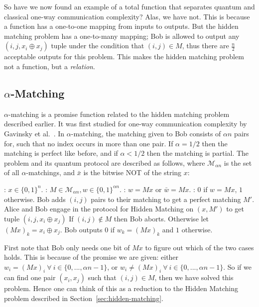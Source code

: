 \documentclass[a4paper]{article}
\begin{document}
        So have we now found an example of a total function that separates quantum and classical one-way communication complexity? Alas, we have not. This is because a function has a one-to-one mapping from inputs to outputs. But the hidden matching problem has a one-to-many mapping; Bob is allowed to output any $(i, j, x_i \oplus x_j)$ tuple under the condition that $(i, j) \in M$, thus there are $\frac{n}{2}$ acceptable outputs for this problem. This makes the hidden matching problem not a function, but a {\em relation}.

        \subsection{$\alpha$-Matching}

        $\alpha$-matching is a promise function related to the hidden matching problem described earlier. It was first studied for one-way communication complexity by Gavinsky et al.~\cite{Gavinsky:2007:ESO:1250790.1250866}. In $\alpha$-matching, the matching given to Bob consists of $\alpha n$ pairs for, such that no index occurs in more than one pair. If $\alpha = 1/2$ then the matching is perfect like before, and if $\alpha < 1/2$ then the matching is partial. The problem and its quantum protocol are described as follows, where $\mathcal{M}_{\alpha n}$ is the set of all $\alpha$-matchings, and $\bar{x}$ is the bitwise NOT of the string $x$:

        \begin{codebox}
            \zi {}: $x \in \{0,1\}^n$.
            \zi {}: $M \in \mathcal{M}_{\alpha n}, w \in \{0, 1\}^{\alpha n}$.
            \zi {}: $w = Mx$ or $\bar{w} = Mx$.
            \zi {}: $0$ if $w = Mx$, $1$ otherwise.
            \li Bob adds $(i, j)$ pairs to their matching to get a perfect matching $M'$.
            \li Alice and Bob engage in the protocol for Hidden Matching on $(x, M')$ to get tuple $(i, j, x_i \oplus x_j)$
            \li If $(i, j) \notin M$ then Bob aborts. Otherwise let $(Mx)_k = x_i \oplus x_j$.
            \li Bob outputs $0$ if $w_k = (Mx)_k$ and $1$ otherwise.
        \end{codebox}

        First note that Bob only needs one bit of $Mx$ to figure out which of the two cases holds. This is because of the promise we are given: either $w_i = (Mx)_i~\forall~i\in\{0,...,\alpha n - 1\}$, or $w_i \neq (Mx)_i~\forall~i\in\{0,...,\alpha n - 1\}$. So if we can find one pair $(x_i, x_j)$ such that $(i, j) \in M$, then we have solved this problem. Hence one can think of this as a reduction to the Hidden Matching problem described in Section~\ref{sec:hidden-matching}.
\end{document}
